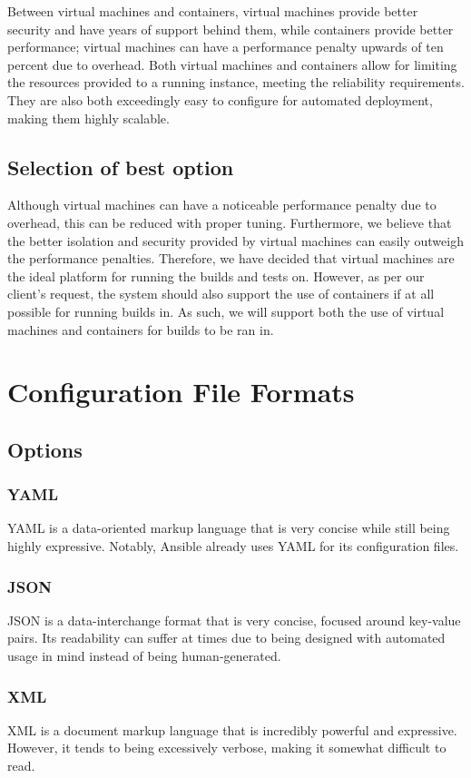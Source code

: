 \documentclass[10pt,letterpaper,onecolumn,journal]{IEEEtran}
\begin{document}
Between virtual machines and containers, virtual machines provide better security and have years of support behind them, while containers provide better performance; virtual machines can have a performance penalty upwards of ten percent due to overhead.\cite{RC25482} Both virtual machines and containers allow for limiting the resources provided to a running instance, meeting the reliability requirements. They are also both exceedingly easy to configure for automated deployment, making them highly scalable.
\subsection{Selection of best option}
Although virtual machines can have a noticeable performance penalty due to overhead, this can be reduced with proper tuning. Furthermore, we believe that the better isolation and security provided by virtual machines can easily outweigh the performance penalties. Therefore, we have decided that virtual machines are the ideal platform for running the builds and tests on. However, as per our client's request, the system should also support the use of containers if at all possible for running builds in. As such, we will support both the use of virtual machines and containers for builds to be ran in.

\section{Configuration File Formats}
\subsection{Options}
\subsubsection{YAML}
YAML is a data-oriented markup language that is very concise while still being highly expressive. Notably, Ansible already uses YAML for its configuration files.
\subsubsection{JSON}
JSON is a data-interchange format that is very concise, focused around key-value pairs. Its readability can suffer at times due to being designed with automated usage in mind instead of being human-generated.
\subsubsection{XML}
XML is a document markup language that is incredibly powerful and expressive. However, it tends to being excessively verbose, making it somewhat difficult to read.
\end{document}

